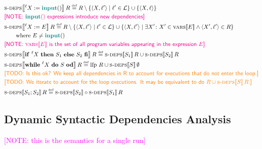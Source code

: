 \documentclass{article}
\newcommand{\defined}{\ensuremath{\stackrel{\mbox{\tiny def}}{=}}\xspace} %
\newcommand{\ipt}{\ensuremath{\mathsf{\mathbf{\color{teal}input}}()}\xspace} %
\newcommand{\tuple}[2]{\ensuremath{\langle #1, #2 \rangle}\xspace} %
\newcommand{\lfp}{\ensuremath{\mathrm{lfp}}\xspace} %
\newcommand{\labels}{\ensuremath{\mathcal{L}}\xspace} %
\newcommand{\semantics}[1]{\ensuremath{\left\llbracket #1 \right\rrbracket}\xspace} %
\newcommand{\sdeps}[1]{\ensuremath{\textsc{s-deps}\!\semantics{#1}}\xspace} %
\newcommand{\ids}[1]{\ensuremath{\textsc{vars}\!\semantics{#1}}\xspace} %
\newcommand{\irem}[3]{{\noindent\textcolor{#1}{\textsf{[#2: 
#3]}}}}
\newcommand{\todo}[1]{\irem{orange}{TODO}{#1}}
\newcommand{\note}[1]{\irem{magenta}{NOTE}{#1}}
\begin{document}
	\begin{align*}
	&\sdeps{^\ell{}X := \ipt}R \defined R \setminus \{ \tuple{X}{\ell{}'} \mid \ell{}' \in \labels \} \cup \{ \tuple{X}{\ell{}} \} 
	\\
	&\mbox{\note{\ipt expressions introduce new dependencies}} \\
	&\sdeps{^\ell{}X := E}R \defined R \setminus \{ \tuple{X}{\ell{}'} \mid \ell{}' \in \labels \} \cup \{ \tuple{X}{\ell{}'} \mid \exists X'\colon X' \in \ids{E} \land \tuple{X'}{\ell{}'} \in R \} \\
	&\qquad\mbox{where $E \not= \ipt$} \\
	&\mbox{\note{\ids{E} is the set of all program variables appearing in the expression $E$}} \\
%
	&\sdeps{\mathsf{\mathbf{if}}~^\ell{}X~\mathsf{\mathbf{then}}~S_1~\mathsf{\mathbf{else}}~S_2~\mathsf{\mathbf{fi}}}R
	 \defined \sdeps{S_1}R \cup \sdeps{S_2}R \\ 
%
&\sdeps{\mathsf{\mathbf{while}}~^\ell{}X~\mathsf{\mathbf{do}}~S~\mathsf{\mathbf{od}}}R
\defined \lfp~R \cup \sdeps{S}\emptyset  \\
&\todo{Is this ok? We keep all dependencies in R to account for executions that do not enter the loop.} \\
&\todo{We iterate to account for the loop executions. It may be equivalent to do $R \cup \sdeps{S}R$.} \\
%
&\sdeps{S_1; S_2}R \defined \sdeps{S_2} \circ 
\sdeps{S_1}R
	\end{align*}

\subsection*{Dynamic Syntactic Dependencies Analysis}

\note{this is the semantics for a single run}
\end{document}
